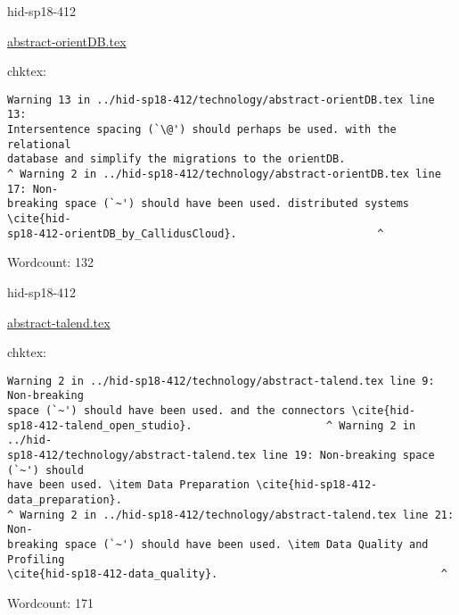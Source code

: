 

\begin{IU}

hid-sp18-412

\href{https://github.com/cloudmesh-community/hid-sp18-412/blob/master//technology/abstract-orientDB.tex}{abstract-orientDB.tex}

 
chktex:
\begin{tiny}
\begin{verbatim}
Warning 13 in ../hid-sp18-412/technology/abstract-orientDB.tex line 13:
Intersentence spacing (`\@') should perhaps be used. with the relational
database and simplify the migrations to the orientDB.
^ Warning 2 in ../hid-sp18-412/technology/abstract-orientDB.tex line 17: Non-
breaking space (`~') should have been used. distributed systems \cite{hid-
sp18-412-orientDB_by_CallidusCloud}.                      ^
\end{verbatim}
\end{tiny}

Wordcount: 132

\end{IU}



\begin{IU}

hid-sp18-412

\href{https://github.com/cloudmesh-community/hid-sp18-412/blob/master//technology/abstract-talend.tex}{abstract-talend.tex}

 
chktex:
\begin{tiny}
\begin{verbatim}
Warning 2 in ../hid-sp18-412/technology/abstract-talend.tex line 9: Non-breaking
space (`~') should have been used. and the connectors \cite{hid-
sp18-412-talend_open_studio}.                     ^ Warning 2 in ../hid-
sp18-412/technology/abstract-talend.tex line 19: Non-breaking space (`~') should
have been used. \item Data Preparation \cite{hid-sp18-412-data_preparation}.
^ Warning 2 in ../hid-sp18-412/technology/abstract-talend.tex line 21: Non-
breaking space (`~') should have been used. \item Data Quality and Profiling
\cite{hid-sp18-412-data_quality}.                                   ^
\end{verbatim}
\end{tiny}

Wordcount: 171

\end{IU}


